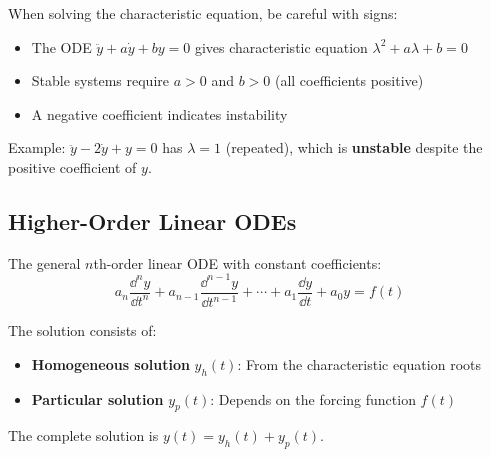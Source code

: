 





\begin{warningbox}[title=Common Pitfall: Sign Errors in Characteristic Equation]
When solving the characteristic equation, be careful with signs:
\begin{itemize}
    \item The ODE $\ddot{y} + a\dot{y} + by = 0$ gives characteristic equation $\lambda^2 + a\lambda + b = 0$
    \item Stable systems require $a > 0$ and $b > 0$ (all coefficients positive)
    \item A negative coefficient indicates instability
\end{itemize}
Example: $\ddot{y} - 2\dot{y} + y = 0$ has $\lambda = 1$ (repeated), which is \textbf{unstable} despite the positive coefficient of $y$.
\end{warningbox}

\subsection{Higher-Order Linear ODEs}

The general $n$th-order linear ODE with constant coefficients:
\begin{equation}
a_n\frac{\dd^n y}{\dd t^n} + a_{n-1}\frac{\dd^{n-1} y}{\dd t^{n-1}} + \cdots + a_1\frac{\dd y}{\dd t} + a_0 y = f(t)
\end{equation}

The solution consists of:
\begin{itemize}
    \item \textbf{Homogeneous solution} $y_h(t)$: From the characteristic equation roots
    \item \textbf{Particular solution} $y_p(t)$: Depends on the forcing function $f(t)$
\end{itemize}

The complete solution is $y(t) = y_h(t) + y_p(t)$.

